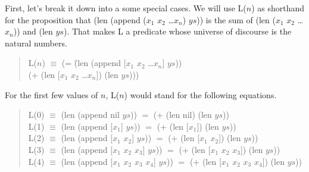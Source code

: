 First, let's break it down into a some special cases.
We will use L($n$) as shorthand for the proposition that
(len (append ($x_1$ $x_2$ \dots $x_n$) $ys$))
is the sum of (len ($x_1$ $x_2$ \dots $x_n$)) and (len $ys$).
That makes L a predicate whose universe of discourse is
the natural numbers.

\label{additive-concat-law-predicate}
\begin{quote}
\begin{tabbing}
L($n$) $\equiv$ (= \=(len (append [$x_1$ $x_2$ \dots $x_n$] $ys$))  \\
                   \>(+ (len [$x_1$ $x_2$ \dots $x_n$]) (len $ys$)))
\end{tabbing}
\end{quote}

For the first few values of $n$, L($n$) would stand for the following equations.
\begin{quote}
L(0) $\equiv$ (len (append nil $ys$)) $=$ (+ (len nil) (len $ys$)) \\
L(1) $\equiv$ (len (append [$x_1$] $ys$)) $=$ (+ (len [$x_1$]) (len $ys$)) \\
L(2) $\equiv$ (len (append [$x_1$ $x_2$] $ys$)) $=$ (+ (len [$x_1$ $x_2$]) (len $ys$)) \\
L(3) $\equiv$ (len (append [$x_1$ $x_2$ $x_3$] $ys$)) $=$ (+ (len [$x_1$ $x_2$ $x_3$]) (len $ys$)) \\
L(4) $\equiv$ (len (append [$x_1$ $x_2$ $x_3$ $x_4$] $ys$)) $=$ (+ (len [$x_1$ $x_2$ $x_3$ $x_4$]) (len $ys$))
\end{quote}


